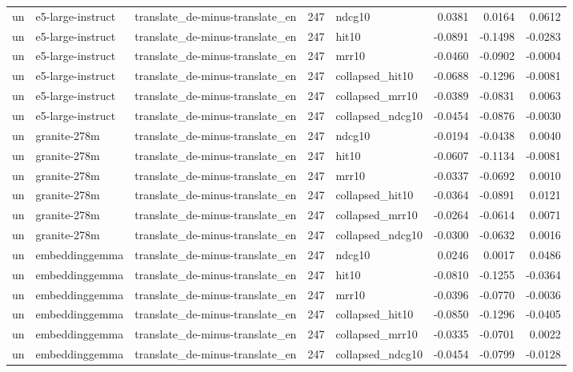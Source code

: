 \begin{tabular}{lllrlrrr}
un & e5-large-instruct & translate\_de-minus-translate\_en & 247 & ndcg10 & 0.0381 & 0.0164 & 0.0612 \\
un & e5-large-instruct & translate\_de-minus-translate\_en & 247 & hit10 & -0.0891 & -0.1498 & -0.0283 \\
un & e5-large-instruct & translate\_de-minus-translate\_en & 247 & mrr10 & -0.0460 & -0.0902 & -0.0004 \\
un & e5-large-instruct & translate\_de-minus-translate\_en & 247 & collapsed\_hit10 & -0.0688 & -0.1296 & -0.0081 \\
un & e5-large-instruct & translate\_de-minus-translate\_en & 247 & collapsed\_mrr10 & -0.0389 & -0.0831 & 0.0063 \\
un & e5-large-instruct & translate\_de-minus-translate\_en & 247 & collapsed\_ndcg10 & -0.0454 & -0.0876 & -0.0030 \\
un & granite-278m & translate\_de-minus-translate\_en & 247 & ndcg10 & -0.0194 & -0.0438 & 0.0040 \\
un & granite-278m & translate\_de-minus-translate\_en & 247 & hit10 & -0.0607 & -0.1134 & -0.0081 \\
un & granite-278m & translate\_de-minus-translate\_en & 247 & mrr10 & -0.0337 & -0.0692 & 0.0010 \\
un & granite-278m & translate\_de-minus-translate\_en & 247 & collapsed\_hit10 & -0.0364 & -0.0891 & 0.0121 \\
un & granite-278m & translate\_de-minus-translate\_en & 247 & collapsed\_mrr10 & -0.0264 & -0.0614 & 0.0071 \\
un & granite-278m & translate\_de-minus-translate\_en & 247 & collapsed\_ndcg10 & -0.0300 & -0.0632 & 0.0016 \\
un & embeddinggemma & translate\_de-minus-translate\_en & 247 & ndcg10 & 0.0246 & 0.0017 & 0.0486 \\
un & embeddinggemma & translate\_de-minus-translate\_en & 247 & hit10 & -0.0810 & -0.1255 & -0.0364 \\
un & embeddinggemma & translate\_de-minus-translate\_en & 247 & mrr10 & -0.0396 & -0.0770 & -0.0036 \\
un & embeddinggemma & translate\_de-minus-translate\_en & 247 & collapsed\_hit10 & -0.0850 & -0.1296 & -0.0405 \\
un & embeddinggemma & translate\_de-minus-translate\_en & 247 & collapsed\_mrr10 & -0.0335 & -0.0701 & 0.0022 \\
un & embeddinggemma & translate\_de-minus-translate\_en & 247 & collapsed\_ndcg10 & -0.0454 & -0.0799 & -0.0128 \\

\end{tabular}
